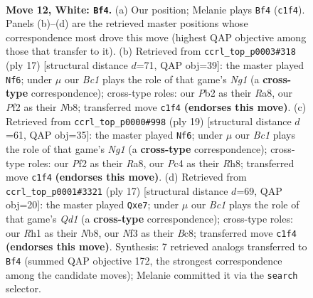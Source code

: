 \documentclass[11pt]{article}
\begin{document}
\clearpage

\begin{figure}[p]\centering
\begin{subfigure}{0.46\textwidth}\centering
\resizebox{\linewidth}{!}{%
\newchessgame
\chessboard[
  setfen={r2qk2r/ppp2ppp/2b1p3/8/1bPP4/5N2/PP2KPPP/R1BQ3R w kq - 0 12},
  showmover=false,
  pgfstyle=straightmove, color=movearrow, markmove={c1-f4}
]}
\caption{}
\end{subfigure}\hfill
\begin{subfigure}{0.46\textwidth}\centering
\resizebox{\linewidth}{!}{%
\newchessgame
\chessboard[
  setfen={rnbqk1nr/pp3ppp/2p5/8/2PPB3/P7/5PPP/R1BQK1NR b KQkq - 0 9},
  showmover=false,
  pgfstyle=straightmove, color=movearrow, markmove={g8-f6}
]}
\caption{}
\end{subfigure}
\\[4pt]
\begin{subfigure}{0.46\textwidth}\centering
\resizebox{\linewidth}{!}{%
\newchessgame
\chessboard[
  setfen={r1bqk1nr/1ppp1ppp/2n5/p7/4P3/PNP1B3/2P2PPP/R2QKB1R b KQkq - 0 10},
  showmover=false,
  pgfstyle=straightmove, color=movearrow, markmove={g8-f6}
]}
\caption{}
\end{subfigure}\hfill
\begin{subfigure}{0.46\textwidth}\centering
\resizebox{\linewidth}{!}{%
\newchessgame
\chessboard[
  setfen={rnbq1rk1/p1p1Bppp/1p6/3p4/3P4/4P3/PP3PPP/2RQKBNR b K - 0 9},
  showmover=false,
  pgfstyle=straightmove, color=movearrow, markmove={d8-e7}
]}
\caption{}
\end{subfigure}
\caption{\textbf{Move 12, White: \texttt{Bf4}.} (a) Our position; Melanie plays \texttt{Bf4} (\texttt{c1f4}). Panels (b)--(d) are the retrieved master positions whose correspondence most drove this move (highest QAP objective among those that transfer to it). (b) Retrieved from \texttt{ccrl\_top\_p0003\#318} (ply 17) [structural distance $d$=71, QAP obj=39]: the master played \texttt{Nf6}; under $\mu$ our \emph{Bc1} plays the role of that game's \emph{Ng1} (a \textbf{cross-type} correspondence); cross-type roles: our \emph{P}b2 as their \emph{R}a8, our \emph{P}f2 as their \emph{N}b8; transferred move \texttt{c1f4} \textbf{(endorses this move)}. (c) Retrieved from \texttt{ccrl\_top\_p0000\#998} (ply 19) [structural distance $d$=61, QAP obj=35]: the master played \texttt{Nf6}; under $\mu$ our \emph{Bc1} plays the role of that game's \emph{Ng1} (a \textbf{cross-type} correspondence); cross-type roles: our \emph{P}f2 as their \emph{R}a8, our \emph{P}c4 as their \emph{R}h8; transferred move \texttt{c1f4} \textbf{(endorses this move)}. (d) Retrieved from \texttt{ccrl\_top\_p0001\#3321} (ply 17) [structural distance $d$=69, QAP obj=20]: the master played \texttt{Qxe7}; under $\mu$ our \emph{Bc1} plays the role of that game's \emph{Qd1} (a \textbf{cross-type} correspondence); cross-type roles: our \emph{R}h1 as their \emph{N}b8, our \emph{N}f3 as their \emph{B}c8; transferred move \texttt{c1f4} \textbf{(endorses this move)}. Synthesis: 7 retrieved analogs transferred to \texttt{Bf4} (summed QAP objective 172, the strongest correspondence among the candidate moves); Melanie committed it via the \texttt{search} selector.}
\label{fig:thought-m22}
\end{figure}
\end{document}
